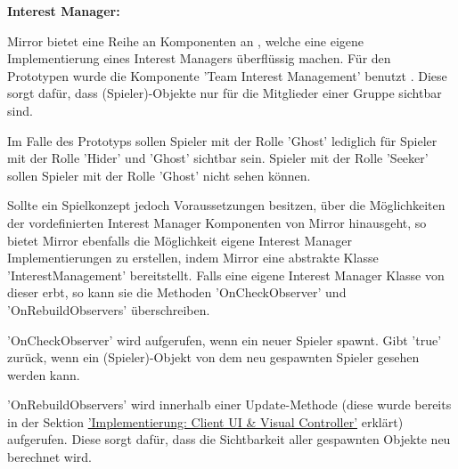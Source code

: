 \textbf{Interest Manager:}

Mirror bietet eine Reihe an Komponenten an \cite{MirrorDocIM}, welche eine eigene Implementierung eines Interest Managers überflüssig machen. Für den Prototypen wurde die Komponente 'Team Interest Management' benutzt \cite{MirrorDocTIM}. Diese sorgt dafür, dass (Spieler)-Objekte nur für die Mitglieder einer Gruppe sichtbar sind. 

Im Falle des Prototyps sollen Spieler mit der Rolle 'Ghost' lediglich für Spieler mit der Rolle 'Hider' und 'Ghost' sichtbar sein. Spieler mit der Rolle 'Seeker' sollen Spieler mit der Rolle 'Ghost' nicht sehen können.

Sollte ein Spielkonzept jedoch Voraussetzungen besitzen, über die Möglichkeiten der vordefinierten Interest Manager Komponenten von Mirror hinausgeht, so bietet Mirror ebenfalls die Möglichkeit eigene Interest Manager Implementierungen zu erstellen, indem Mirror eine abstrakte Klasse 'InterestManagement' bereitstellt. Falls eine eigene Interest Manager Klasse von dieser erbt, so kann sie die Methoden 'OnCheckObserver' und 'OnRebuildObservers' überschreiben. \cite{MirrorDocCIM}

'OnCheckObserver' wird aufgerufen, wenn ein neuer Spieler spawnt. Gibt 'true' zurück, wenn ein (Spieler)-Objekt von dem neu gespawnten Spieler gesehen werden kann.

'OnRebuildObservers' wird innerhalb einer Update-Methode (diese wurde bereits in der Sektion \hyperref[implementierung:client_UI_Controller]{'Implementierung: Client UI \& Visual Controller'} erklärt) aufgerufen. Diese sorgt dafür, dass die Sichtbarkeit aller gespawnten Objekte neu berechnet wird.





